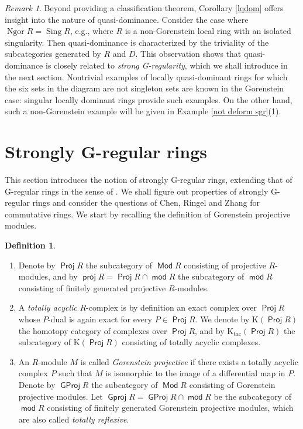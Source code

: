 \documentclass{amsart}
\theoremstyle{definition}
\newtheorem{dfn}[thm]{Definition}
\theoremstyle{remark}
\newtheorem{rem}[thm]{Remark}
\numberwithin{equation}{thm}
\def\Gproj{\operatorname{\mathsf{Gproj}}}
\def\GProj{\operatorname{\mathsf{GProj}}}
\def\K{\mathrm{K}}
\def\Ktac{\mathrm{K}_{\operatorname{tac}}}
\def\Mod{\operatorname{\mathsf{Mod}}}
\def\mod{\operatorname{\mathsf{mod}}}
\def\ng{\operatorname{Ngor}}
\def\Proj{\operatorname{\mathsf{Proj}}}
\def\proj{\operatorname{\mathsf{proj}}}
\def\sing{\operatorname{Sing}}
\begin{document}
\begin{rem}
Beyond providing a classification theorem, Corollary \ref{lqdom} offers insight into the nature of quasi-dominance.
Consider the case where $\ng R=\sing R$, e.g., where $R$ is a non-Gorenstein local ring with an isolated singularity.
Then quasi-dominance is characterized by the triviality of the subcategories generated by $R$ and $D$.
This observation shows that quasi-dominance is closely related to {\em strong G-regularity}, which we shall introduce in the next section.
Nontrivial examples of locally quasi-dominant rings for which the six sets in the diagram are not singleton sets are known in the Gorenstein case: singular locally dominant rings provide such examples.
On the other hand, such a non-Gorenstein example will be given in Example \ref{not deform sgr}(1).
\end{rem}

\section{Strongly G-regular rings}

This section introduces the notion of strongly G-regular rings, extending that of G-regular rings in the sense of \cite{T08}.
We shall figure out properties of strongly G-regular rings and consider the questions of Chen, Ringel and Zhang for commutative rings.
We start by recalling the definition of Gorenstein projective modules.

\begin{dfn}
\begin{enumerate}[(1)]
\item
Denote by $\Proj R$ the subcategory of $\Mod R$ consisting of projective $R$-modules, and by $\proj R=\Proj R\cap\mod R$ the subcategory of $\mod R$ consisting of finitely generated projective $R$-modules.
\item
A {\em totally acyclic} $R$-complex is by definition an exact complex over $\Proj R$ whose $P$-dual is again exact for every $P\in\Proj R$.
We denote by $\K(\Proj R)$ the homotopy category of complexes over $\Proj R$, and by $\Ktac (\Proj R)$ the subcategory of $\K(\Proj R)$ consisting of totally acyclic complexes.
\item
An $R$-module $M$ is called \textit{Gorenstein projective} if there exists a totally acyclic complex $P$ such that $M$ is isomorphic to the image of a differential map in $P$.
Denote by $\GProj R$ the subcategory of $\Mod R$ consisting of Gorenstein projective modules.
Let $\Gproj R=\GProj R\cap\mod R$ be the subcategory of $\mod R$ consisting of finitely generated Gorenstein projective modules, which are also called {\em totally reflexive}.
\end{enumerate}
\end{dfn}
\end{document}
